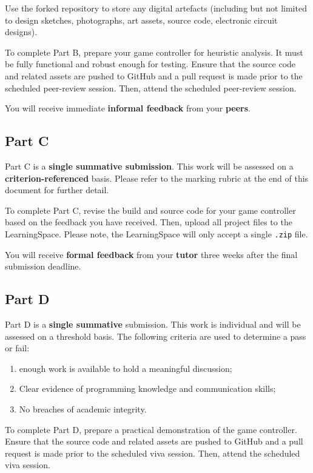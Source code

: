 \documentclass{../fal_assignment}
\begin{document}
Use the forked repository to store any digital artefacts (including but not limited to design sketches, photographs, art assets, source code, electronic circuit designs). 

To complete Part B, prepare your game controller for heuristic analysis. It must be fully functional and robust enough for testing. Ensure that the source code and related assets are pushed to GitHub and a pull request is made prior to the scheduled peer-review session. Then, attend the scheduled peer-review session.

You will receive immediate \textbf{informal feedback} from your \textbf{peers}.

\subsection*{Part C}

Part C is a \textbf{single summative submission}. This work will be assessed on a \textbf{criterion-referenced} basis. Please refer to the marking rubric at the end of this document for further detail.

To complete Part C, revise the build and source code for your game controller based on the feedback you have received. Then, upload all project files to the LearningSpace. Please note, the LearningSpace will only accept a single \texttt{.zip} file.

You will receive \textbf{formal feedback} from your \textbf{tutor} three weeks after the final submission deadline.
\subsection*{Part D}

Part D is a \textbf{single summative} submission. This work is individual and will be assessed on a threshold basis. The following criteria are used to determine a pass or fail: 

\begin{enumerate}[label=(\alph*)]
	\item enough work is available to hold a meaningful discussion; 
	\item Clear evidence of programming knowledge and communication skills; 
	\item No breaches of academic integrity. 
\end{enumerate}

To complete Part D, prepare a practical demonstration of the game controller. Ensure that the source code and related assets are pushed to GitHub and a pull request is made prior to the scheduled viva session. Then, attend the scheduled viva session. 
\end{document}

